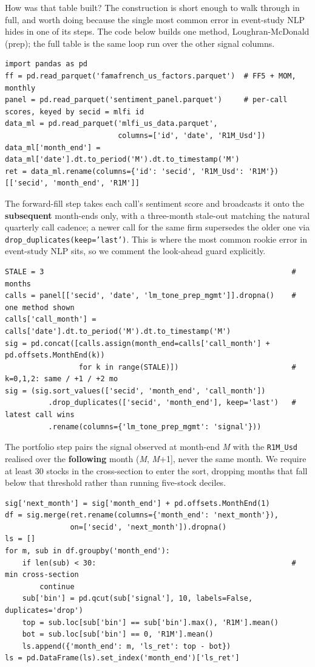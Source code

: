 How was that table built? The construction is short enough to walk through in full, and worth doing because the single most common error in event-study NLP hides in one of its steps. The code below builds one method, Loughran-McDonald (prep); the full table is the same loop run over the other signal columns.

\begin{verbatim}
import pandas as pd
ff = pd.read_parquet('famafrench_us_factors.parquet')  # FF5 + MOM, monthly
panel = pd.read_parquet('sentiment_panel.parquet')     # per-call scores, keyed by secid = mlfi id
data_ml = pd.read_parquet('mlfi_us_data.parquet',
                          columns=['id', 'date', 'R1M_Usd'])
data_ml['month_end'] = data_ml['date'].dt.to_period('M').dt.to_timestamp('M')
ret = data_ml.rename(columns={'id': 'secid', 'R1M_Usd': 'R1M'})[['secid', 'month_end', 'R1M']]
\end{verbatim}

The forward-fill step takes each call's sentiment score and broadcasts it onto the \textbf{subsequent} month-ends only, with a three-month stale-out matching the natural quarterly call cadence; a newer call for the same firm supersedes the older one via \texttt{drop\_duplicates(keep='last')}. This is where the most common rookie error in event-study NLP sits, so we comment the look-ahead guard explicitly.

\begin{verbatim}
STALE = 3                                                         # months
calls = panel[['secid', 'date', 'lm_tone_prep_mgmt']].dropna()    # one method shown
calls['call_month'] = calls['date'].dt.to_period('M').dt.to_timestamp('M')
sig = pd.concat([calls.assign(month_end=calls['call_month'] + pd.offsets.MonthEnd(k))
                 for k in range(STALE)])                          # k=0,1,2: same / +1 / +2 mo
sig = (sig.sort_values(['secid', 'month_end', 'call_month'])
          .drop_duplicates(['secid', 'month_end'], keep='last')   # latest call wins
          .rename(columns={'lm_tone_prep_mgmt': 'signal'}))
\end{verbatim}

The portfolio step pairs the signal observed at month-end \textit{M} with the \texttt{R1M\_Usd} realised over the \textbf{following} month (\textit{M}, \textit{M}+1], never the same month. We require at least 30 stocks in the cross-section to enter the sort, dropping months that fall below that threshold rather than running five-stock deciles.

\begin{verbatim}
sig['next_month'] = sig['month_end'] + pd.offsets.MonthEnd(1)
df = sig.merge(ret.rename(columns={'month_end': 'next_month'}),
               on=['secid', 'next_month']).dropna()
ls = []
for m, sub in df.groupby('month_end'):
    if len(sub) < 30:                                             # min cross-section
        continue
    sub['bin'] = pd.qcut(sub['signal'], 10, labels=False, duplicates='drop')
    top = sub.loc[sub['bin'] == sub['bin'].max(), 'R1M'].mean()
    bot = sub.loc[sub['bin'] == 0, 'R1M'].mean()
    ls.append({'month_end': m, 'ls_ret': top - bot})
ls = pd.DataFrame(ls).set_index('month_end')['ls_ret']
\end{verbatim}

